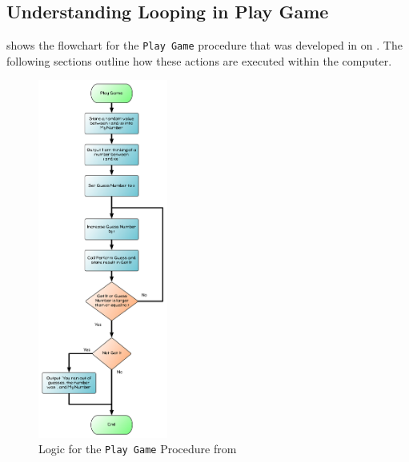 

\clearpage
\subsection{Understanding Looping in Play Game} %
\label{sub:understanding_looping_in_play_game}

 shows the flowchart for the \texttt{Play Game} procedure that was developed in  on . The following sections outline how these actions are executed within the computer.

\begin{figure}[htbp]
   \centering
   \includegraphics[width=0.38\textwidth]{./topics/control-flow/diagrams/PlayGame} 
   \caption{Logic for the \texttt{Play Game} Procedure from }
   \label{fig:play-game-understanding}
\end{figure}

